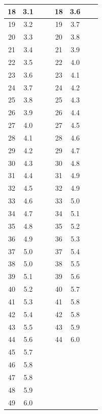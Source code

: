 \documentclass[a4paper, 12pt]{article}
\begin{document}
\begin{table}[!ht]
{\begin{tabular}{|c|c||c|c||c|c||c|c|}
                    18 & 3.1 &  &  & 18 & 3.6 &  & \\ \hline
                    19 & 3.2 &  &  & 19 & 3.7 &  & \\ \hline
                    20 & 3.3 &  &  & 20 & 3.8 &  & \\ \hline
                    21 & 3.4 &  &  & 21 & 3.9 &  & \\ \hline
                    22 & 3.5 &  &  & 22 & 4.0 &  & \\ \hline
                    23 & 3.6 &  &  & 23 & 4.1 &  & \\ \hline
                    24 & 3.7 &  &  & 24 & 4.2 &  & \\ \hline
                    25 & 3.8 &  &  & 25 & 4.3 &  & \\ \hline
                    26 & 3.9 &  &  & 26 & 4.4 &  & \\ \hline
                    27 & 4.0 &  &  & 27 & 4.5 &  & \\ \hline
                    28 & 4.1 &  &  & 28 & 4.6 &  & \\ \hline
                    29 & 4.2 &  &  & 29 & 4.7 &  & \\ \hline
                    30 & 4.3 &  &  & 30 & 4.8 &  & \\ \hline
                    31 & 4.4 &  &  & 31 & 4.9 &  & \\ \hline
                    32 & 4.5 &  &  & 32 & 4.9 &  & \\ \hline
                    33 & 4.6 &  &  & 33 & 5.0 &  & \\ \hline
                    34 & 4.7 &  &  & 34 & 5.1 &  & \\ \hline
                    35 & 4.8 &  &  & 35 & 5.2 &  & \\ \hline
                    36 & 4.9 &  &  & 36 & 5.3 &  & \\ \hline
                    37 & 5.0 &  &  & 37 & 5.4 &  & \\ \hline
                    38 & 5.0 &  &  & 38 & 5.5 &  & \\ \hline
                    39 & 5.1 &  &  & 39 & 5.6 &  & \\ \hline
                    40 & 5.2 &  &  & 40 & 5.7 &  & \\ \hline
                    41 & 5.3 &  &  & 41 & 5.8 &  & \\ \hline
                    42 & 5.4 &  &  & 42 & 5.8 &  & \\ \hline
                    43 & 5.5 &  &  & 43 & 5.9 &  & \\ \hline
                    44 & 5.6 &  &  & 44 & 6.0 &  & \\ \hline
                    45 & 5.7 &  &  &  &  &  & \\ \hline
                    46 & 5.8 &  &  &  &  &  & \\ \hline
                    47 & 5.8 &  &  &  &  &  & \\ \hline
                    48 & 5.9 &  &  &  &  &  & \\ \hline
                    49 & 6.0 &  &  &  &  &  & \\ \hline


\end{tabular}}
\end{table}
\end{document}
